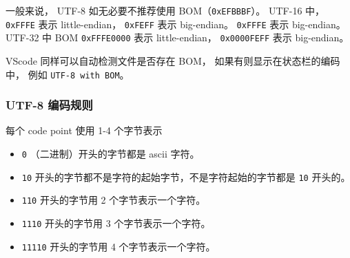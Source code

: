 一般来说， UTF-8 如无必要不推荐使用 BOM（\verb`0xEFBBBF`）。 UTF-16 中， \verb`0xFFFE` 表示 little-endian， \verb`0xFEFF` 表示 big-endian。 \verb`0xFFFE` 表示 big-endian。 UTF-32 中 BOM \verb`0xFFFE0000` 表示 little-endian， \verb`0x0000FEFF` 表示 big-endian。

VScode 同样可以自动检测文件是否存在 BOM， 如果有则显示在状态栏的编码中， 例如 \verb`UTF-8 with BOM`。

\subsubsection{UTF-8 编码规则}
每个 code point 使用 1-4 个字节表示
\begin{itemize}
\item \verb`0` （二进制）开头的字节都是 ascii 字符。
\item \verb`10` 开头的字节都不是字符的起始字节，不是字符起始的字节都是 \verb`10` 开头的。
\item \verb`110` 开头的字节用 2 个字节表示一个字符。
\item \verb`1110` 开头的字节用 3 个字节表示一个字符。
\item \verb`11110` 开头的字节用 4 个字节表示一个字符。
\end{itemize}
